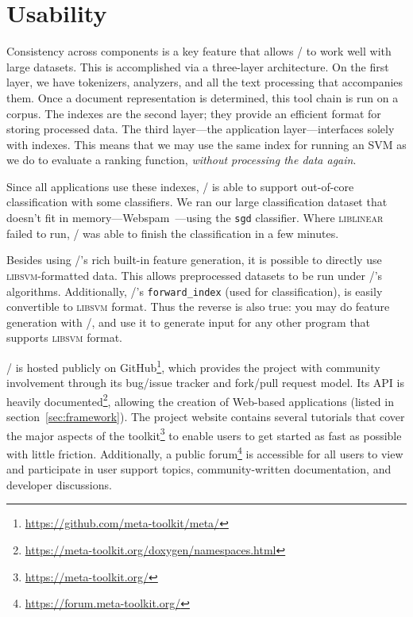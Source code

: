 \section{Usability}

Consistency across components is a key feature that allows \meta/ to work
well with large datasets. This is accomplished via a three-layer architecture.
On the first layer, we have tokenizers, analyzers, and all the text processing
that accompanies them. Once a document representation is determined, this tool
chain is run on a corpus. The indexes are the second layer; they provide an
efficient format for storing processed data. The third layer---the application
layer---interfaces solely with indexes. This means that we may use the same
index for running an SVM as we do to evaluate a ranking function, \emph{without
processing the data again}.

Since all applications use these indexes, \meta/ is able to support out-of-core
classification with some classifiers. We ran our large classification dataset
that doesn't fit in memory---Webspam~\cite{Webb:2006:CEAS}---using the
\texttt{sgd} classifier. Where \textsc{liblinear} failed to run, \meta/ was able
to finish the classification in a few minutes.

Besides using \meta/'s rich built-in feature generation, it is possible to
directly use \textsc{libsvm}-formatted data. This allows preprocessed datasets
to be run under \meta/'s algorithms. Additionally, \meta/'s
\texttt{forward\_index} (used for classification), is easily convertible to
\textsc{libsvm} format. Thus the reverse is also true: you may do feature
generation with \meta/, and use it to generate input for any other program that
supports \textsc{libsvm} format.

\meta/ is hosted publicly on
GitHub\footnote{\url{https://github.com/meta-toolkit/meta/}}, which provides the
project with community involvement through its bug/issue tracker and fork/pull
request model. Its API is heavily
documented\footnote{\url{https://meta-toolkit.org/doxygen/namespaces.html}},
allowing the creation of Web-based applications (listed in
section~\ref{sec:framework}). The project website contains several tutorials
that cover the major aspects of the
toolkit\footnote{\url{https://meta-toolkit.org/}} to enable users to get started
as fast as possible with little friction. Additionally, a public
forum\footnote{\url{https://forum.meta-toolkit.org/}} is accessible for all
users to view and participate in user support topics, community-written
documentation, and developer discussions.

